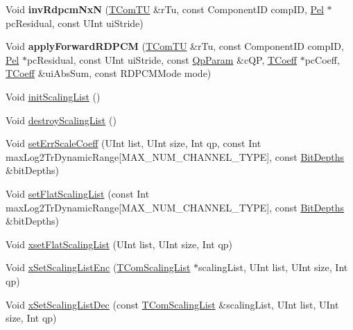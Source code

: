 \begin{DoxyCompactItemize}
\item 
\mbox{\label{class_t_com_tr_quant_aa8c4f81a49a41d3ec183c047b971b304}} 
Void {\bfseries inv\+Rdpcm\+NxN} (\hyperlink{class_t_com_t_u}{T\+Com\+TU} \&r\+Tu, const Component\+ID comp\+ID, \hyperlink{_type_def_8h_af92141699657699b4b547be0c8517541}{Pel} $\ast$pc\+Residual, const U\+Int ui\+Stride)
\item 
\mbox{\label{class_t_com_tr_quant_a86b2c6c76feb56e3a4c9d5fd7e9a0044}} 
Void {\bfseries apply\+Forward\+R\+D\+P\+CM} (\hyperlink{class_t_com_t_u}{T\+Com\+TU} \&r\+Tu, const Component\+ID comp\+ID, \hyperlink{_type_def_8h_af92141699657699b4b547be0c8517541}{Pel} $\ast$pc\+Residual, const U\+Int ui\+Stride, const \hyperlink{struct_qp_param}{Qp\+Param} \&c\+QP, \hyperlink{_type_def_8h_a5bdd3b17d14ed1978c366d2d958c0300}{T\+Coeff} $\ast$pc\+Coeff, \hyperlink{_type_def_8h_a5bdd3b17d14ed1978c366d2d958c0300}{T\+Coeff} \&ui\+Abs\+Sum, const R\+D\+P\+C\+M\+Mode mode)
\item 
Void \hyperlink{class_t_com_tr_quant_a5510fb7211905c436e1de355188a20e7}{init\+Scaling\+List} ()
\item 
Void \hyperlink{class_t_com_tr_quant_ad31a45f114c1005a9b12f1747c9381a0}{destroy\+Scaling\+List} ()
\item 
Void \hyperlink{class_t_com_tr_quant_aeffe0e7e8256286a627f9442c1b425db}{set\+Err\+Scale\+Coeff} (U\+Int list, U\+Int size, Int qp, const Int max\+Log2\+Tr\+Dynamic\+Range\mbox{[}M\+A\+X\+\_\+\+N\+U\+M\+\_\+\+C\+H\+A\+N\+N\+E\+L\+\_\+\+T\+Y\+PE\mbox{]}, const \hyperlink{struct_bit_depths}{Bit\+Depths} \&bit\+Depths)
\item 
Void \hyperlink{class_t_com_tr_quant_a52b99b63d50a0573d23e34ccdb88c5de}{set\+Flat\+Scaling\+List} (const Int max\+Log2\+Tr\+Dynamic\+Range\mbox{[}M\+A\+X\+\_\+\+N\+U\+M\+\_\+\+C\+H\+A\+N\+N\+E\+L\+\_\+\+T\+Y\+PE\mbox{]}, const \hyperlink{struct_bit_depths}{Bit\+Depths} \&bit\+Depths)
\item 
Void \hyperlink{class_t_com_tr_quant_abc7b69ee11eb57b28b81cee626bc2112}{xset\+Flat\+Scaling\+List} (U\+Int list, U\+Int size, Int qp)
\item 
Void \hyperlink{class_t_com_tr_quant_a9d5822af574f183c893b6ea060027fbf}{x\+Set\+Scaling\+List\+Enc} (\hyperlink{class_t_com_scaling_list}{T\+Com\+Scaling\+List} $\ast$scaling\+List, U\+Int list, U\+Int size, Int qp)
\item 
Void \hyperlink{class_t_com_tr_quant_a27d473a108b43a8826fa966df8adb8de}{x\+Set\+Scaling\+List\+Dec} (const \hyperlink{class_t_com_scaling_list}{T\+Com\+Scaling\+List} \&scaling\+List, U\+Int list, U\+Int size, Int qp)

\end{DoxyCompactItemize}
